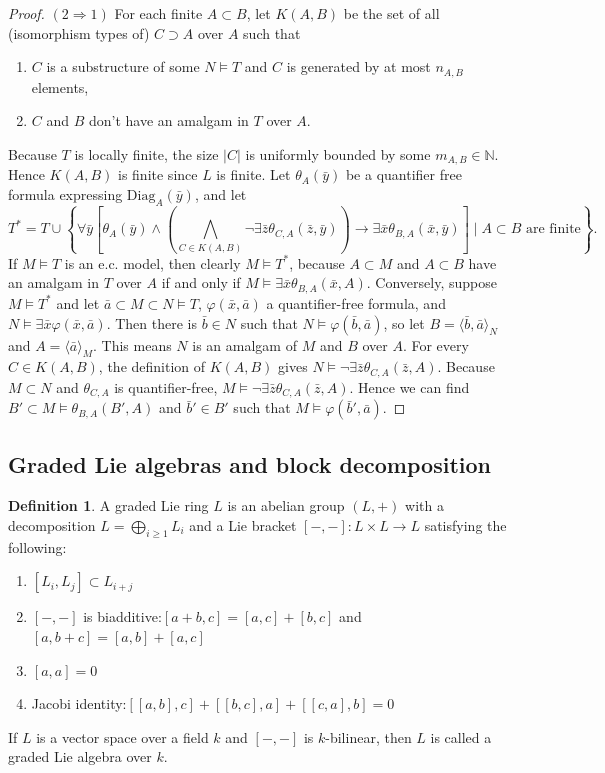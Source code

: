 \documentclass[11pt,reqno]{article}
\theoremstyle{definition}
\newtheorem{definition}[theorem]{Definition}
\theoremstyle{remark}
\newcommand{\N}{\mathbb{N}}
\begin{document}
\begin{proof}
    $(2\Rightarrow 1)$
    For each finite $A\subset B$, let $K(A,B)$ be the set of all (isomorphism types of) $C\supset A$ over $A$ such that
    \begin{enumerate}
        \item $C$ is a substructure of some $N\models T$ and $C$ is generated by at most $n_{A,B}$ elements,
        \item $C$ and $B$ don't have an amalgam in $T$ over $A$.
    \end{enumerate}
    Because $T$ is locally finite, the size $|C|$ is uniformly bounded by some $m_{A,B}\in\N$. 
    Hence $K(A,B)$ is finite since $L$ is finite.
    Let $\theta_A(\bar y)$ be a quantifier free formula expressing $\mathrm{Diag}_A(\bar y)$, and let
    \[
        T^*=T\cup \left\{\forall \bar y\left[\theta_A(\bar y)\wedge\left(\bigwedge_{C\in K(A,B)}\neg\exists \bar z\theta_{C,A}(\bar z, \bar y)\right) \to \exists \bar x\theta_{B,A}(\bar x,\bar y)\right] \mid A\subset B\text{ are finite}\right\}. 
        \]
    If $M\models T$ is an e.c. model, then clearly $M\models T^*$, because $A\subset M$ and $A\subset B$ have an amalgam in $T$ over $A$ if and only if $M\models\exists \bar x\theta_{B,A}(\bar x,A)$.
    Conversely, suppose $M\models T^*$ and let $\bar a\subset M\subset N\models T$, $\varphi(\bar x,\bar a)$ a quantifier-free formula, and $N\models \exists \bar x\varphi(\bar x, \bar a)$.
    Then there is $\bar b\in N$ such that $N\models \varphi(\bar b,\bar a)$, so let $B=\langle \bar b,\bar a\rangle_N$ and $A=\langle \bar a\rangle_M$.
    This means $N$ is an amalgam of $M$ and $B$ over $A$.
    For every $C\in K(A,B)$, the definition of $K(A,B)$ gives $N\models \neg\exists \bar z\theta_{C,A}(\bar z, A)$.
    Because $M\subset N$ and $\theta_{C,A}$ is quantifier-free, $M\models \neg\exists \bar z\theta_{C,A}(\bar z, A)$. Hence we can find $B'\subset M\models \theta_{B,A}(B',A)$ and $\bar b'\in B'$ such that $M\models\varphi(\bar b',\bar a)$.
\end{proof}


\subsection{Graded Lie algebras and block decomposition}
\begin{definition}
    A graded Lie ring $L$ is an abelian group
    $(L,+)$ with a decomposition $L=\bigoplus_{i\geq 1}L_i$ and a Lie
    bracket $[-,-]:L\times L\to L$ satisfying the following:
    \begin{enumerate}
        \item $[L_i,L_j]\subset L_{i+j}$
        \item $[-,-]$ is biadditive:$[a+b,c]=[a,c]+[b,c]$ and $[a,b+c]=[a,b]+[a,c]$
        \item $[a,a]=0$
        \item Jacobi identity:$[[a,b],c]+[[b,c],a]+[[c,a],b]=0$
    \end{enumerate}
    If $L$ is a vector space over a field $k$ and $[-,-]$ is $k$-bilinear,
    then $L$ is called a graded Lie algebra over $k$.
\end{definition}
\end{document}
